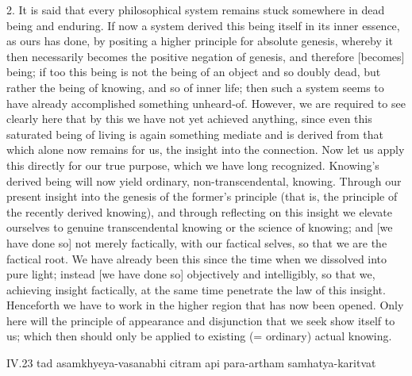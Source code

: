 2. It is said that every philosophical system
remains stuck somewhere in dead being and enduring.
If now a system derived this being itself in its inner essence,
as ours has done, by positing
a higher principle for absolute genesis,
whereby it then necessarily becomes
the positive negation of genesis,
and therefore [becomes] being;
if too this being is not the being of an object and so doubly dead,
but rather the being of knowing, and so of inner life;
then such a system seems to have already
accomplished something unheard-of.
However, we are required to see clearly here that
by this we have not yet achieved anything,
since even this saturated being of living is
again something mediate
and is derived from that
which alone now remains for us,
the insight into the connection.
Now let us apply this directly for our true purpose,
which we have long recognized.
Knowing's derived being will now yield
ordinary, non-transcendental, knowing.
Through our present insight into
the genesis of the former's principle
(that is, the principle of the recently derived knowing),
and through reflecting on this insight
we elevate ourselves to genuine transcendental knowing
or the science of knowing;
and [we have done so] not merely factically,
with our factical selves,
so that we are the factical root.
We have already been this since
the time when we dissolved into pure light;
instead [we have done so] objectively and intelligibly,
so that we, achieving insight factically,
at the same time penetrate the law of this insight.
Henceforth we have to work in the higher region
that has now been opened.
Only here will the principle of
appearance and disjunction
that we seek show itself to us;
which then should only be applied to
existing (= ordinary) actual knowing.

IV.23
tad asamkhyeya-vasanabhi citram api para-artham samhatya-karitvat


